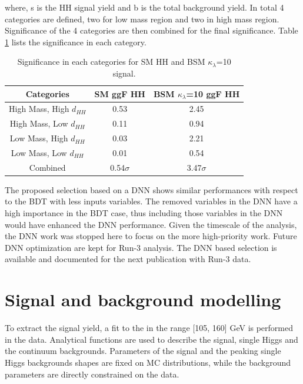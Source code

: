 where, s is the HH signal yield and b is the total background yield. In total 4 categories are defined, two for low mass region and two in high mass region. Significance of the 4 categories are then combined for the final significance. Table \ref{tab:Sig} lists the significance in each category. \\
\begin{table}[htbp]
    \centering
    \begin{tabular}{ccc}
        \hline\hline
        Categories & SM ggF HH & BSM $\kappa_\lambda$=10 ggF HH \\
        \hline
        High Mass, High $d_{HH}$ & 0.53 & 2.45 \\
        High Mass, Low $d_{HH}$ & 0.11 & 0.94 \\
        Low Mass, High $d_{HH}$ & 0.03 & 2.21 \\
        Low Mass, Low $d_{HH}$ & 0.01 & 0.54 \\
        \hline
        Combined & 0.54$\sigma$ & 3.47$\sigma$ \\
        \hline
        \hline
    \end{tabular}
    \begin{tcolorbox}[colback=black!5!white, colframe=white!75!black]
    \caption{Significance in each categories for SM HH and BSM $\kappa_\lambda$=10 signal.}
    \label{tab:Sig}
    \end{tcolorbox}
    
\end{table}
The proposed selection based on a DNN shows similar performances with respect to the BDT with less inputs variables. The removed variables in the DNN have a high importance in the BDT case, thus including those variables in the DNN would have enhanced the DNN performance. Given the timescale of the analysis, the DNN work was stopped here to focus on the more high-priority work. Future DNN optimization are kept for Run-3 analysis. The DNN based selection is available and documented for the next publication with Run-3 data. \\

\section{Signal and background modelling}
\label{HHyybb:Modelling}

To extract the \HHyybb signal yield, a fit to the \myy in the range [105, 160] GeV is performed in the data. Analytical functions are used to describe the signal, single Higgs and the continuum backgrounds. Parameters of the signal and the peaking single Higgs backgrounds shapes are fixed on MC distributions, while the background parameters are directly constrained on the data.   

